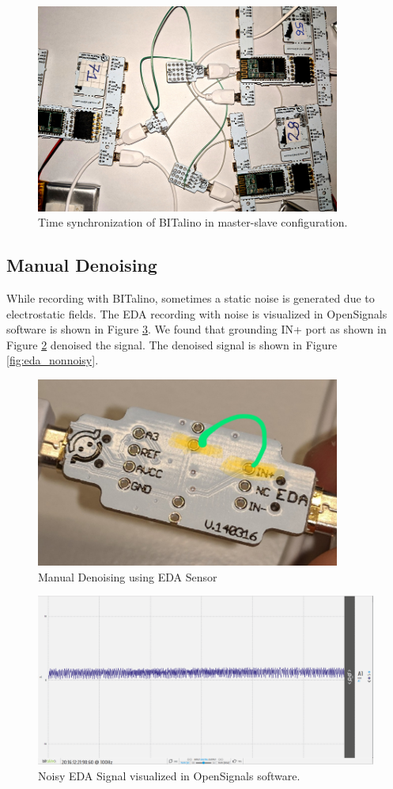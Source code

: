 \begin{figure}
\centering
\includegraphics[width=100mm]{Figures/time_syn_bitalino.jpg}
\caption{Time synchronization of BITalino in master-slave configuration.}
\label{fig:time_sync_bitalino}
\end{figure}
\subsection{Manual Denoising}
\label{sec:denoising}
While recording with BITalino, sometimes a static noise is generated due to electrostatic fields. The EDA recording with noise is visualized in OpenSignals software is shown in Figure \ref{fig:eda_noisy}. We found that grounding IN+ port as shown in Figure \ref{fig:eda_denoising} denoised the signal. The denoised signal is shown in Figure \ref{fig:eda_nonnoisy}.


\begin{figure}
\centering
\includegraphics[width=100mm]{Figures/eda_denoising.jpeg}
\caption{Manual Denoising using EDA Sensor}
\label{fig:eda_denoising}
\end{figure}

\begin{figure}
\centering
\includegraphics[width=130mm]{Figures/eda_noisy.PNG}
\caption{Noisy EDA Signal visualized in OpenSignals software.}
\label{fig:eda_noisy}
\end{figure}

